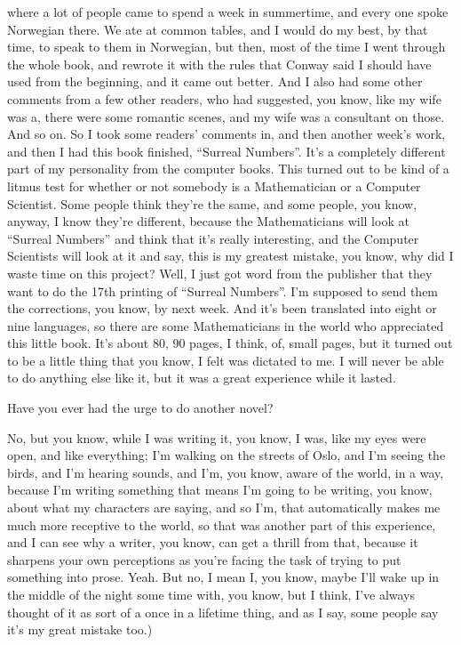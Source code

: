 \documentclass[]{article}
\begin{document}
where a lot of people came to spend a week in summertime, and every one
spoke Norwegian there. We ate at common tables, and I would do my best,
by that time, to speak to them in Norwegian, but then, most of the time
I went through the whole book, and rewrote it with the rules that Conway
said I should have used from the beginning, and it came out better. And
I also had some other comments from a few other readers, who had
suggested, you know, like my wife was a, there were some romantic
scenes, and my wife was a consultant on those. And so on. So I took some
readers' comments in, and then another week's work, and then I had this
book finished, ``Surreal Numbers''. It's a completely different part of
my personality from the computer books. This turned out to be kind of a
litmus test for whether or not somebody is a Mathematician or a Computer
Scientist. Some people think they're the same, and some people, you
know, anyway, I know they're different, because the Mathematicians will
look at ``Surreal Numbers'' and think that it's really interesting, and
the Computer Scientists will look at it and say, this is my greatest
mistake, you know, why did I waste time on this project? Well, I just
got word from the publisher that they want to do the 17th printing of
``Surreal Numbers''. I'm supposed to send them the corrections, you
know, by next week. And it's been translated into eight or nine
languages, so there are some Mathematicians in the world who appreciated
this little book. It's about 80, 90 pages, I think, of, small pages, but
it turned out to be a little thing that you know, I felt was dictated to
me. I will never be able to do anything else like it, but it was a great
experience while it lasted.

Have you ever had the urge to do another novel?

No, but you know, while I was writing it, you know, I was, like my eyes
were open, and like everything; I'm walking on the streets of Oslo, and
I'm seeing the birds, and I'm hearing sounds, and I'm, you know, aware
of the world, in a way, because I'm writing something that means I'm
going to be writing, you know, about what my characters are saying, and
so I'm, that automatically makes me much more receptive to the world, so
that was another part of this experience, and I can see why a writer,
you know, can get a thrill from that, because it sharpens your own
perceptions as you're facing the task of trying to put something into
prose. Yeah. But no, I mean I, you know, maybe I'll wake up in the
middle of the night some time with, you know, but I think, I've always
thought of it as sort of a once in a lifetime thing, and as I say, some
people say it's my great mistake too.)
\end{document}
